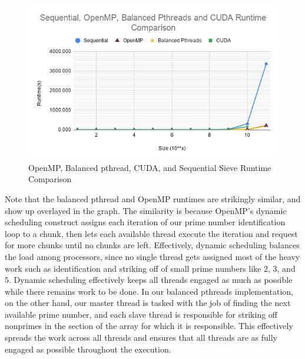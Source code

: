 \documentclass[11pt,twocolumn]{article}
\begin{document}
\begin{figure}
\includegraphics[width=15cm]{runtime-comp.png}
\caption{OpenMP, Balanced pthread, CUDA, and Sequential Sieve Runtime Comparison}
\label{runtimecomp}
\end{figure}

Note that the balanced pthread and OpenMP runtimes are strikingly 
similar, and show up overlayed in the graph. The similarity is 
because OpenMP's dynamic scheduling construct assigns each iteration
of our prime number identification loop to a chunk, then lets each 
available thread execute
the iteration and request for more chunks until no chunks are left.
Effectively, dynamic scheduling balances the load among processors,
since no single thread gets assigned most of the heavy work such as
identification and striking off of small prime numbers like $2$,
$3$, and $5$. Dynamic scheduling effectively keeps all threads
engaged as much as possible while there remains work to be done.
In our balanced pthreads implementation, on the other hand, our master
thread is tasked with the job of finding the next available prime
number, and each slave thread is responsible for striking off nonprimes
in the section of the array for which it is responsible. This effectively 
spreads the work across all threads and ensures that all threads are 
as fully engaged as possible throughout the execution. 
\end{document}
